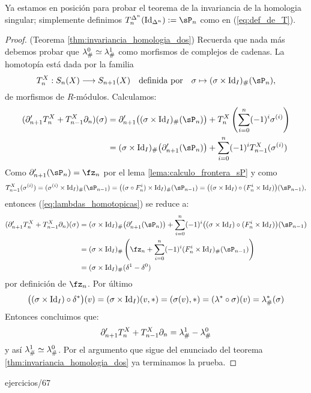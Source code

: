 \documentclass[../../topologia_algebraica]{subfiles}
\begin{document}
Ya estamos en posici\'on para probar el teorema de la invariancia de la homologia singular;
simplemente definimos $T_n^{\Delta^n}(\Id_{\Delta^n}):=\sP_n$ como en (\ref{eq:def_de_T}).

\begin{proof}(Teorema \ref{thm:invariancia_homologia_dos})
  Recuerda que nada m\'as debemos probar que $\lambda^0_{\#}\simeq\lambda^1_{\#}$ como morfismos
  de complejos de cadenas. La homotop\'ia est\'a dada por la familia
  \[
    T_n^X:S_n(X)\lra S_{n+1}(X) \quad\text{definida por}\quad
    \sigma  \mapsto  (\sigma\times\Id_I)_{\#}(\sP_n),
  \]
  de morfismos de $R$-m\'odulos. Calculamos:
  \begin{align}\label{eq:lambdas_homotopicas}
    (\partial'_{n+1}T^X_n+T^X_{n-1}\partial_n)(\sigma)&=
    \partial'_{n+1}\big( (\sigma\times\Id_I)_{\#}(\sP_n) \big)+
    T^X_n\paren{\sum_{i=0}^n(-1)^i\sigma^{(i)}}\nonumber\\ & =
    (\sigma\times\Id_I)_{\#}\big( \partial'_{n+1}(\sP_n) \big)+
    \sum_{i=0}^n(-1)^iT^X_{n-1}(\sigma^{(i)})
  \end{align}
  Como $\partial_{n+1}'(\sP_n)=\fz_n$ por el lema \ref{lema:calculo_frontera_sP} y
  como
  \[
    T^X_{n-1}(\sigma^{(i)})=(\sigma^{(i)}\times\Id_I)_{\#}(\sP_{n-1})=
    \big((\sigma\circ F^i_n)\times\Id_I)_{\#}(\sP_{n-1})=
    \big( (\sigma\times\Id_I)\circ(F^i_n\times\Id_I) \big)(\sP_{n-1}),
  \]
  entonces (\ref{eq:lambdas_homotopicas}) se reduce a:
  \begin{align*}
    (\partial'_{n+1}T^X_n+T^X_{n-1}\partial_n)(\sigma)&=
    (\sigma\times\Id_I)_{\#}\big( \partial'_{n+1}(\sP_n) \big)+
    \sum_{i=0}^n(-1)^i\big( (\sigma\times\Id_I)\circ(F^i_n\times\Id_I) \big)(\sP_{n-1}) \\ & =
    (\sigma\times\Id_I)_{\#}\paren{\fz_n+\sum_{i=0}^n(-1)^i(F^i_n\times\Id_I)_{\#}(\sP_{n-1})} \\ & =
    (\sigma\times\Id_I)_{\#}(\delta^1-\delta^0)
  \end{align*}
  por definici\'on de $\fz_n$. Por \'ultimo 
  \[
    \big((\sigma\times\text{Id}_I)\circ\delta^{*}\big)(v)=
    (\sigma\times\text{Id}_I)(v,*)=(\sigma(v),*)=(\lambda^{*}\circ\sigma)(v)=\lambda^{*}_{\#}(\sigma)
  \]
  Entonces concluimos que:
  \[
    \partial'_{n+1}T^X_n+T^X_{n-1}\partial_n=\lambda^1_{\#}-\lambda^0_{\#}
  \]
  y as\'i $\lambda^1_{\#}\simeq\lambda^0_{\#}$. Por el argumento que sigue del enunciado del
  teorema \ref{thm:invariancia_homologia_dos} ya terminamos la prueba. 
\end{proof} 

{ejercicios/67} %
\end{document}
